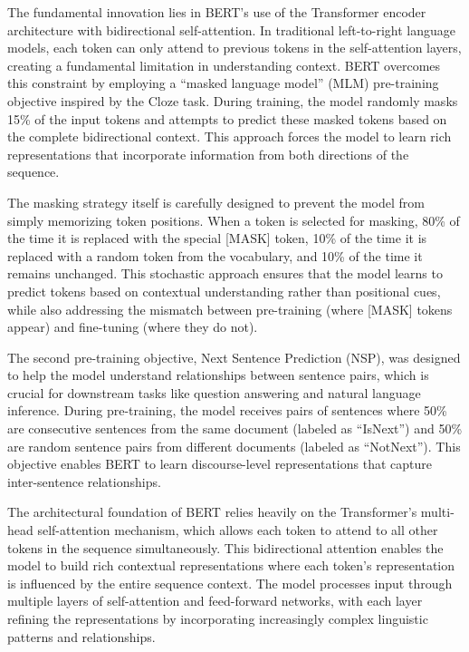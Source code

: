 \documentclass[
  titlepage]{article}
\begin{document}
The fundamental innovation lies in BERT's use of the Transformer encoder
architecture with bidirectional self-attention. In traditional
left-to-right language models, each token can only attend to previous
tokens in the self-attention layers, creating a fundamental limitation
in understanding context. BERT overcomes this constraint by employing a
``masked language model'' (MLM) pre-training objective inspired by the
Cloze task. During training, the model randomly masks 15\% of the input
tokens and attempts to predict these masked tokens based on the complete
bidirectional context. This approach forces the model to learn rich
representations that incorporate information from both directions of the
sequence.

The masking strategy itself is carefully designed to prevent the model
from simply memorizing token positions. When a token is selected for
masking, 80\% of the time it is replaced with the special {[}MASK{]}
token, 10\% of the time it is replaced with a random token from the
vocabulary, and 10\% of the time it remains unchanged. This stochastic
approach ensures that the model learns to predict tokens based on
contextual understanding rather than positional cues, while also
addressing the mismatch between pre-training (where {[}MASK{]} tokens
appear) and fine-tuning (where they do not).

The second pre-training objective, Next Sentence Prediction (NSP), was
designed to help the model understand relationships between sentence
pairs, which is crucial for downstream tasks like question answering and
natural language inference. During pre-training, the model receives
pairs of sentences where 50\% are consecutive sentences from the same
document (labeled as ``IsNext'') and 50\% are random sentence pairs from
different documents (labeled as ``NotNext''). This objective enables
BERT to learn discourse-level representations that capture
inter-sentence relationships.

The architectural foundation of BERT relies heavily on the Transformer's
multi-head self-attention mechanism, which allows each token to attend
to all other tokens in the sequence simultaneously. This bidirectional
attention enables the model to build rich contextual representations
where each token's representation is influenced by the entire sequence
context. The model processes input through multiple layers of
self-attention and feed-forward networks, with each layer refining the
representations by incorporating increasingly complex linguistic
patterns and relationships.
\end{document}
